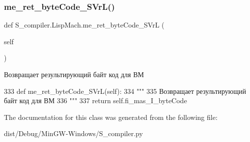\subsubsection{\texorpdfstring{me\+\_\+ret\+\_\+byte\+Code\+\_\+\+S\+Vr\+L()}{me\_ret\_byteCode\_SVrL()}}
{\footnotesize\ttfamily def S\+\_\+compiler.\+Lisp\+Mach.\+me\+\_\+ret\+\_\+byte\+Code\+\_\+\+S\+VrL (\begin{DoxyParamCaption}\item[{}]{self }\end{DoxyParamCaption})}

\begin{DoxyVerb} Возвращает результирующий байт код для ВМ 
\end{DoxyVerb}
 
\begin{DoxyCode}
333  \textcolor{keyword}{def }me\_ret\_byteCode\_SVrL(self):
334     \textcolor{stringliteral}{"""}
335 \textcolor{stringliteral}{         Возвращает результирующий байт код для ВМ }
336 \textcolor{stringliteral}{    """}      
337     \textcolor{keywordflow}{return} self.fi\_mas\_I\_byteCode
\end{DoxyCode}


The documentation for this class was generated from the following file\+:\begin{DoxyCompactItemize}
\item 
dist/\+Debug/\+Min\+G\+W-\/\+Windows/S\+\_\+compiler.\+py\end{DoxyCompactItemize}
